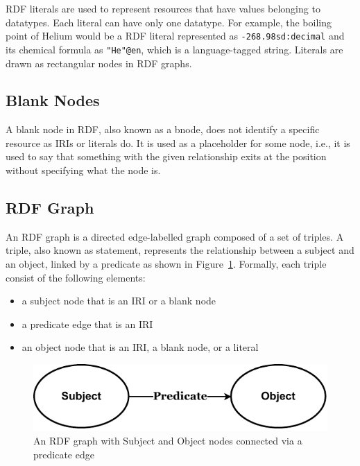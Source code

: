 RDF literals are used to represent resources that have values belonging to datatypes. Each literal can have only one datatype. For example, the boiling point of Helium would be a RDF literal represented as \texttt{-268.9^^xsd:decimal} and its chemical formula as \texttt{"He"@en}, which is a language-tagged string. Literals are drawn as rectangular nodes in RDF graphs. 

\subsection*{Blank Nodes}
A blank node in RDF, also known as a bnode, does not identify a specific resource as IRIs or literals do. It is used as a placeholder for some node, i.e., it is used to say that something with the given relationship exits at the position without specifying what the node is.


\subsection{RDF Graph}
\begin{definition}	
An RDF graph is a directed edge-labelled graph composed of a set of triples. A triple, also known as statement, represents the relationship between a subject and an object, linked by a predicate as shown in Figure~\ref{fig:figure 2}. Formally, each triple consist of the following elements:  

\begin{itemize}
	\item a subject node that is an IRI or a blank node
	\item a predicate edge that is an IRI
	\item an object node that is an IRI, a blank node, or a literal
\end{itemize}	
\end{definition}

\begin{figure}[h]
  \centering
  \includegraphics[width=0.75 \linewidth]{images/rdf_relation.drawio.pdf}
  \caption{An RDF graph with Subject and Object nodes connected via a predicate edge}
  \label{fig:figure 2}
\end{figure}



